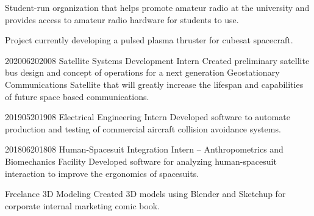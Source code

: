 \documentclass[letterpaper,ddMMMyyyy,nonstopmode]{simpleresumecv}
\begin{document}
\begin{Body}
                {Student-run organization that helps promote amateur
                    radio at the university and provides access to amateur
                    radio hardware for students to use.
                    }

            



            {Project currently developing a pulsed plasma thruster
                for cubesat spacecraft.}


        


            {2020}{06}{2020}{08}
            {Satellite Systems Development Intern}
            {Created preliminary satellite bus design and concept of operations 
            for a next generation Geostationary Communications Satellite that will greatly increase the 
            lifespan and capabilities of future space based communications. }

                {2019}{05}{2019}{08}
                {Electrical Engineering Intern}
                {Developed software to automate production and testing of commercial aircraft
                    collision avoidance systems.}

                {2018}{06}{2018}{08}
                {Human-Spacesuit Integration Intern -- Anthropometrics and Biomechanics Facility}
                {Developed software for analyzing human-spacesuit interaction to improve the ergonomics
                    of spacesuits.}

                {Freelance 3D Modeling}
                {Created 3D models using Blender and Sketchup for corporate
                    internal marketing comic book.}




\end{Body}
\end{document}
